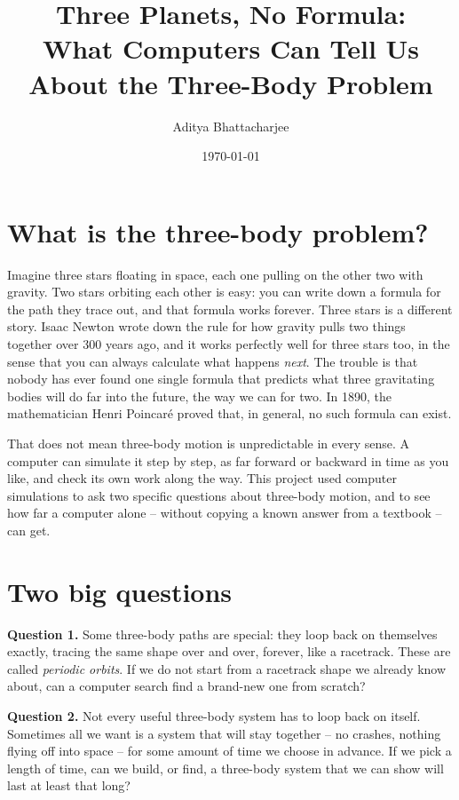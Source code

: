 \documentclass[11pt]{article}
\title{Three Planets, No Formula:\\
What Computers Can Tell Us About the Three-Body Problem}
\author{Aditya Bhattacharjee}
\date{\today}
\begin{document}
\maketitle

\section{What is the three-body problem?}

Imagine three stars floating in space, each one pulling on the other two
with gravity. Two stars orbiting each other is easy: you can write down a
formula for the path they trace out, and that formula works forever. Three
stars is a different story. Isaac Newton wrote down the rule for how
gravity pulls two things together over 300 years ago, and it works
perfectly well for three stars too, in the sense that you can always
calculate what happens \emph{next}. The trouble is that nobody has ever
found one single formula that predicts what three gravitating bodies will
do far into the future, the way we can for two. In 1890, the
mathematician Henri Poincar\'e proved that, in general, no such formula
can exist.

That does not mean three-body motion is unpredictable in every sense. A
computer can simulate it step by step, as far forward or backward in time
as you like, and check its own work along the way. This project used
computer simulations to ask two specific questions about three-body
motion, and to see how far a computer alone -- without copying a known
answer from a textbook -- can get.

\section{Two big questions}

\textbf{Question 1.} Some three-body paths are special: they loop back on
themselves exactly, tracing the same shape over and over, forever, like a
racetrack. These are called \emph{periodic orbits}. If we do not start
from a racetrack shape we already know about, can a computer search find
a brand-new one from scratch?

\textbf{Question 2.} Not every useful three-body system has to loop back
on itself. Sometimes all we want is a system that will stay together --
no crashes, nothing flying off into space -- for some amount of time we
choose in advance. If we pick a length of time, can we build, or find, a
three-body system that we can show will last at least that long?
\end{document}
